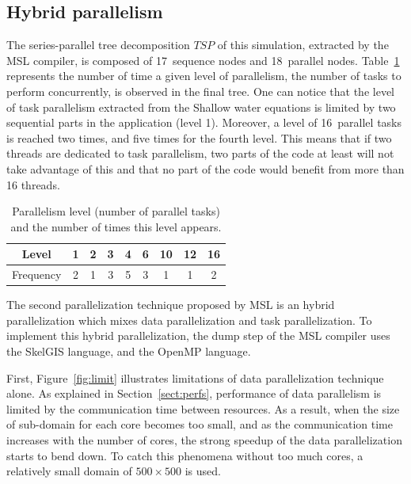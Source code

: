 \subsection{Hybrid parallelism}

The series-parallel tree decomposition $TSP$ of this simulation, extracted by the MSL compiler, is composed of 17~sequence nodes and 18~parallel nodes. Table~\ref{fig:freq} represents the number of time a given level of parallelism, \ie the number of tasks to perform concurrently, is observed in the final tree. One can notice that the level of task parallelism extracted from the Shallow water equations is limited by two sequential parts in the application (level 1). Moreover, a level of 16~parallel tasks is reached two times, and five times for the fourth level.
This means that if two threads are dedicated to task parallelism, two parts of the code at least will not take advantage of this and that no part of the code would benefit from more than 16 threads.

\begin{table}[!h]
 \begin{center}
 \begin{tabular}{|c|c|c|c|c|c|c|c|c|}
    \hline 
   Level & 1 & 2 & 3 & 4 & 6 & 10 & 12 & 16\\
   \hline
   Frequency & 2 & 1 & 3 & 5 & 3 & 1 & 1 & 2\\
   \hline
 \end{tabular}
\caption{Parallelism level (number of parallel tasks) and the number of times this level appears.}
\label{fig:freq}
 \end{center}
\end{table}

The second parallelization technique proposed by MSL is an hybrid parallelization which mixes data parallelization and task parallelization. To implement this hybrid parallelization, the dump step of the MSL compiler uses the SkelGIS language, and the OpenMP language.

First, Figure~\ref{fig:limit} illustrates limitations of data parallelization technique alone. As explained in Section~\ref{sect:perfs}, performance of data parallelism is limited by the communication time between resources. As a result, when the size of sub-domain for each core becomes too small, and as the communication time increases with the number of cores, the strong speedup of the data parallelization starts to bend down. To catch this phenomena without too much cores, a relatively small domain of $500 \times 500$ is used.

